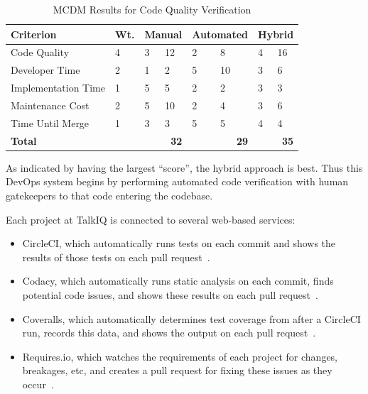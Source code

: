 \documentclass[12pt]{article}
\begin{document}
\begin{table}[ht]
\caption{MCDM Results for Code Quality Verification}
\label{tbl:mcdm-cqv}
\centering
\begin{tabular}{|p{4.0cm}|p{0.65cm}|p{0.5cm}|p{0.5cm}|p{0.8cm}|p{0.8cm}|p{0.45cm}|p{0.45cm}|}
    \hline
    {\bf Criterion} & {\bf Wt.} & \multicolumn{2}{|p{1cm}|}{{\bf Manual}} & \multicolumn{2}{|p{1.6cm}|}{{\bf \mbox{Automated}}} & \multicolumn{2}{|p{0.9cm}|}{{\bf Hybrid}} \\
    \hline
    \hline
    Code Quality        &  4 & 3 & 12 & 2 &  8 & 4 & 16 \\
    Developer Time      &  2 & 1 &  2 & 5 & 10 & 3 &  6 \\
    Implementation Time &  1 & 5 &  5 & 2 &  2 & 3 &  3 \\
    Maintenance Cost    &  2 & 5 & 10 & 2 &  4 & 3 &  6 \\
    Time Until Merge    &  1 & 3 &  3 & 5 &  5 & 4 &  4 \\
    \hline
    \hline
    {\bf Total}         &    & \multicolumn{2}{|r|}{{\bf 32}} & \multicolumn{2}{|r|}{{\bf 29}} & \multicolumn{2}{|r|}{{\bf 35}} \\
    \hline
\end{tabular}
\end{table}

As indicated by having the largest ``score'', the hybrid approach is best. Thus this DevOps system begins by performing automated code verification with human gatekeepers to that code entering the codebase.

Each project at TalkIQ is connected to several web-based services:
\begin{itemize}
\item CircleCI, which automatically runs tests on each commit and shows the results of those tests on each pull request~\cite{circleci}.
\item Codacy, which automatically runs static analysis on each commit, finds potential code issues, and shows these results on each pull request~\cite{codacy}.
\item Coveralls, which automatically determines test coverage from after a CircleCI run, records this data, and shows the output on each pull request~\cite{coveralls}.
\item Requires.io, which watches the requirements of each project for changes, breakages, etc, and creates a pull request for fixing these issues as they occur~\cite{requires}.
\end{itemize}
\end{document}
